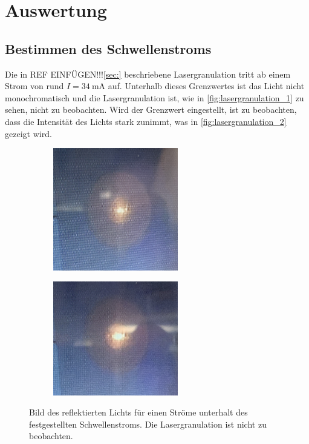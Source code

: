 \section{Auswertung}
\label{sec:Auswertung}

\subsection{Bestimmen des Schwellenstroms}
Die in REF EINFÜGEN!!!\ref{sec:} beschriebene Lasergranulation tritt ab einem Strom von rund $I=\qty{34}{\milli\ampere}$ auf. Unterhalb dieses Grenzwertes ist das Licht
nicht monochromatisch und die Lasergranulation ist, wie in \autoref{fig:lasergranulation_1} zu sehen, nicht zu beobachten. Wird der Grenzwert eingestellt, ist zu beobachten,
dass die Intensität des Lichts stark zunimmt, was in \autoref{fig:lasergranulation_2} gezeigt wird.

  \begin{figure}
    \begin{subfigure}[c]{0.5\textwidth}
        \centering
        \includegraphics[width=0.6\textwidth]{content/pics/30mA.png}
    
    \end{subfigure}
    \begin{subfigure}[c]{0.5\textwidth}
        \centering
        \includegraphics[width=0.6\textwidth]{content/pics/33,5mA.png}
    \end{subfigure}
    \caption{Bild des reflektierten Lichts für einen Ströme unterhalt des festgestellten Schwellenstroms. Die Lasergranulation ist nicht zu beobachten.}
    \label{fig:lasergranulation_1}
\end{figure}


